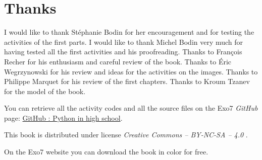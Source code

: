 
\clearemptydoublepage
\pagestyle{empty}\thispagestyle{empty}

\vspace*{\fill}

\section*{Thanks}


I would like to thank Stéphanie Bodin for her encouragement and for testing the activities of the first parts.
I would like to thank Michel Bodin very much for having tested all the first activities and his proofreading.
Thanks to François Recher for his enthusiasm and careful review of the book. 
Thanks to Éric Wegrzynowski for his review and ideas for the activities on the images. 
Thanks to Philippe Marquet for his review of the first chapters. Thanks to Kroum Tzanev for the model of the book.


\bigskip

\begin{center}
You can retrieve all the activity codes \Python{} and all the source files on the Exo7 \emph{GitHub} page:
\href{https://github.com/exo7math/python1-en-exo7}{\og{}GitHub : Python in high school\fg{}}.

\medskip




\end{center}


\vspace*{\fill}

\bigskip 

\begin{center}
\end{center}



\begin{center}
This book is distributed under license \emph{Creative Commons -- BY-NC-SA -- 4.0 }.

On the Exo7 website you can download the book in color for free.
\end{center}




\printindex
{}

